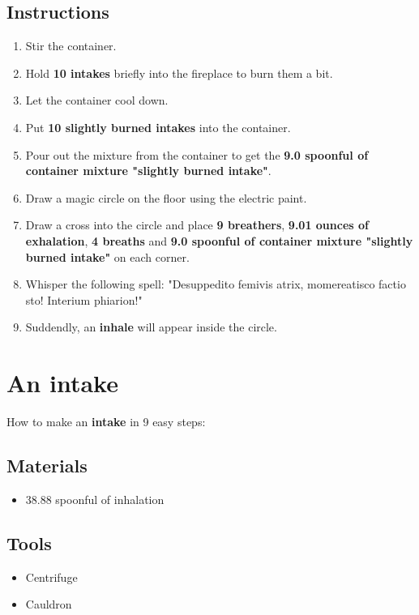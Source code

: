 \documentclass{article}
\begin{document}
\subsection{Instructions}\begin{enumerate}
\item 
Stir the container.
\item 
Hold \textbf{10 intakes} briefly into the fireplace to burn them a bit.
\item 
Let the container cool down.
\item 
Put \textbf{10 slightly burned intakes} into the container.
\item 
Pour out the mixture from the container to get the \textbf{9.0 spoonful of container mixture "slightly burned intake"}.
\item 
Draw a magic circle on the floor using the electric paint.
\item 
Draw a cross into the circle and place \textbf{9 breathers}, \textbf{9.01 ounces of exhalation}, \textbf{4 breaths} and \textbf{9.0 spoonful of container mixture "slightly burned intake"} on each corner.
\item 
Whisper the following spell: "Desuppedito femivis atrix, momereatisco factio sto! Interium phiarion!"
\item 
Suddendly, an \textbf{inhale} will appear inside the circle.
\end{enumerate}
\newpage
\section{An intake}How to make an \textbf{intake} in 9 easy steps:

\subsection{Materials}\begin{itemize}
\item 
38.88 spoonful of inhalation
\end{itemize}
\subsection{Tools}\begin{itemize}
\item 
Centrifuge
\item 
Cauldron
\end{itemize}
\end{document}
